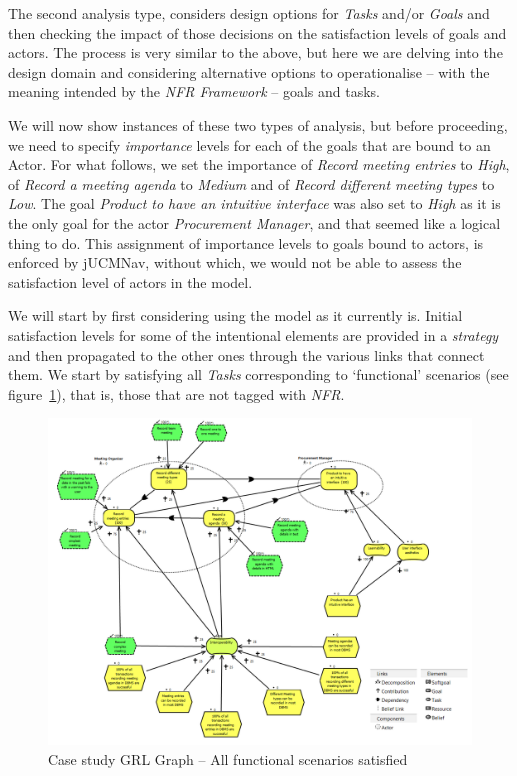 \documentclass[dissertation,final]{softeng}
\begin{document}
The second analysis type, considers design options for \emph{Tasks} and/or \emph{Goals} and then checking the impact of those decisions on the satisfaction levels of goals and actors. The process is very similar to the above, but here we are delving into the design domain and considering alternative options to operationalise -- with the meaning intended by the \emph{NFR Framework} -- goals and tasks.

We will now show instances of these two types of analysis, but before proceeding, we need to specify \emph{importance} levels for each of the goals that are bound to an Actor. For what follows, we set the importance of \emph{Record meeting entries} to \emph{High}, of \emph{Record a meeting agenda} to \emph{Medium} and of \emph{Record different meeting types} to \emph{Low}. The goal \emph{Product to have an intuitive interface} was also set to \emph{High} as it is the only goal for the actor \emph{Procurement Manager}, and that seemed like a logical thing to do. This assignment of importance levels to goals bound to actors, is enforced by jUCMNav, without which, we would not be able to assess the satisfaction level of actors in the model.
 
We will start by first considering using the model as it currently is. Initial satisfaction levels for some of the intentional elements are provided in a \emph{strategy} and then propagated to the other ones through the various links that connect them. We start by satisfying all \emph{Tasks} corresponding to `functional' scenarios (see figure~\ref{fig:casestudy-functionalscenarios}), that is, those that are not tagged with \emph{NFR}.

\begin{figure}
\includegraphics[width=\columnwidth]{casestudy-functionalscenarios}
\centering
\caption{Case study GRL Graph -- All functional scenarios satisfied}
\label{fig:casestudy-functionalscenarios}
\end{figure}
\end{document}

